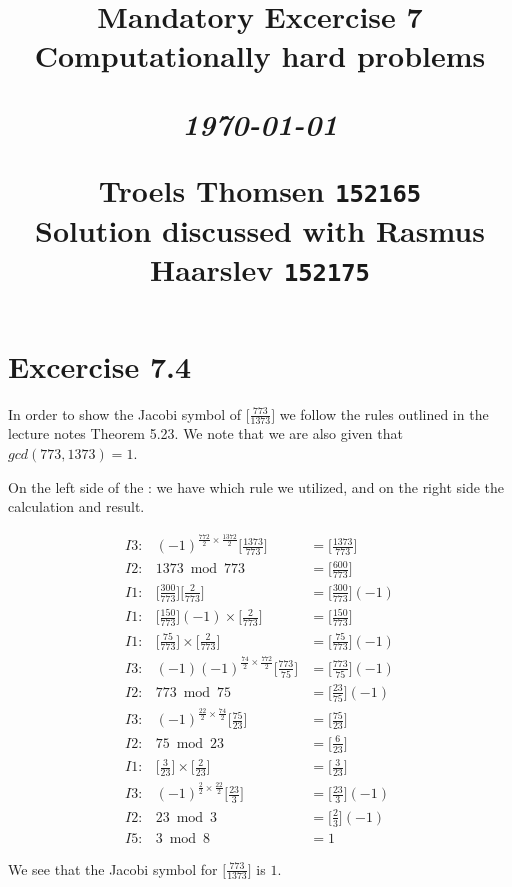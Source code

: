 \documentclass[12pt]{article}
\title{
  \vspace{4cm}
  \begin{flushleft}
  \Large{\textbf{Mandatory Excercise 7}} \\
  \large{Computationally hard problems}
  \end{flushleft}
  \vspace{0cm}
  \begin{flushleft}
  \small
  \textit{\today}
  \end{flushleft}
  \vspace{12cm}
  \begin{flushleft}
  \small
  Troels Thomsen \texttt{152165} \\
  Solution discussed with Rasmus Haarslev \texttt{152175}
  \end{flushleft}
}
\date{
}
\begin{document}
\clearpage
{}
\thispagestyle{empty}
\maketitle

\newpage


\section{Excercise 7.4}

In order to show the Jacobi symbol of $\Big[\frac{773}{1373}\Big]$ we follow the rules outlined in the lecture notes Theorem 5.23. We note that we are also given that $gcd(773, 1373) = 1$.

On the left side of the : we have which rule we utilized, and on the right side the calculation and result.

\begin{eqnarray}
    I3 : & (-1)^{\frac{772}{2}\times\frac{1372}{2}} \Big[\frac{1373}{773}\Big] & = \Big[\frac{1373}{773}\Big] \\
    I2 : & 1373 \bmod 773 & = \Big[\frac{600}{773}\Big] \\
    I1 : & \Big[\frac{300}{773}\Big] \Big[\frac{2}{773}\Big] & = \Big[\frac{300}{773}\Big](-1) \\
    I1 : & \Big[\frac{150}{773}\Big](-1) \times \Big[\frac{2}{773}\Big] & = \Big[\frac{150}{773}\Big] \\
    I1 : & \Big[\frac{75}{773}\Big] \times \Big[\frac{2}{773}\Big] & = \Big[\frac{75}{773}\Big](-1) \\
    I3 : & (-1)(-1)^{\frac{74}{2} \times \frac{772}{2}}\Big[\frac{773}{75}\Big] & = \Big[\frac{773}{75}\Big](-1) \\
    I2 : & 773 \bmod 75 & = \Big[\frac{23}{75}\Big](-1) \\
    I3 : & (-1)^{\frac{22}{2} \times \frac{74}{2}}\Big[\frac{75}{23}\Big] & = \Big[\frac{75}{23}\Big] \\
    I2 : & 75 \bmod 23 & = \Big[\frac{6}{23}\Big] \\
    I1 : & \Big[\frac{3}{23}\Big] \times \Big[\frac{2}{23}\Big] & = \Big[\frac{3}{23}\Big] \\
    I3 : & (-1)^{\frac{2}{2} \times \frac{22}{2}}\Big[\frac{23}{3}\Big] & = \Big[\frac{23}{3}\Big](-1) \\
    I2 : & 23 \bmod 3 & = \Big[\frac{2}{3}\Big](-1) \\
    I5 : & 3 \bmod 8 & = 1
\end{eqnarray}

We see that the Jacobi symbol for $\Big[\frac{773}{1373}\Big]$ is $1$.
\end{document}

